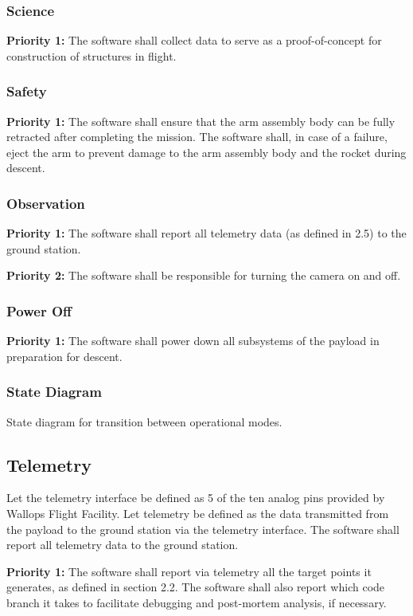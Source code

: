\documentclass[letterpaper,10pt]{article}
\begin{document}
\subsubsection{Science}
\textbf{Priority 1:}
The software shall collect data to serve as a proof-of-concept for construction of structures in flight.

\subsubsection{Safety}
\textbf{Priority 1:}
The software shall ensure that the arm assembly body can be fully retracted after completing the mission.
The software shall, in case of a failure, eject the arm to prevent damage to the arm assembly body and the rocket during descent.

\subsubsection{Observation}
\textbf{Priority 1:}
The software shall report all telemetry data (as defined in 2.5) to the ground station.

\textbf{Priority 2:}
The software shall be responsible for turning the camera on and off.

\subsubsection{Power Off}
\textbf{Priority 1:}
The software shall power down all subsystems of the payload in preparation for descent.

\subsubsection{State Diagram}

\begin{center}
State diagram for transition between operational modes.
\end{center}

\subsection{Telemetry}
Let the telemetry interface be defined as 5 of the ten analog pins provided by Wallops Flight Facility.
Let telemetry be defined as the data transmitted from the payload to the ground station via the telemetry interface.
The software shall report all telemetry data to the ground station.

\textbf{Priority 1:}
The software shall report via telemetry all the target points it generates, as defined in section 2.2.
The software shall also report which code branch it takes to facilitate debugging and post-mortem analysis, if necessary. 
\end{document}
